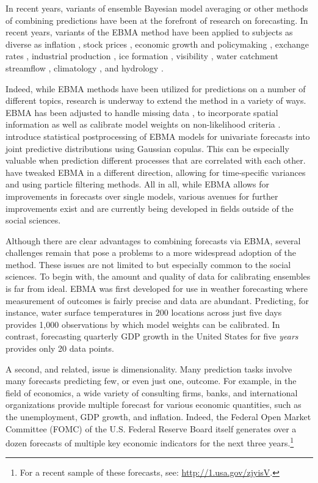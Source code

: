 \documentclass[12pt,fullpage,endnotes]{article}
\begin{document}
In recent years, variants of ensemble Bayesian model averaging or other methods of combining predictions have been at the forefront of research on forecasting. In recent years, variants of the EBMA method have been applied to subjects as diverse as inflation \citep{Wright:2009, Koop:2010, Gneiting:2010},
stock prices \citep{Billio:2011}, economic growth and policymaking
\citep{Brock:2007, Billio:2010}, exchange rates \citep{Wright:2008},
industrial production \citep{Feldkircher:2010}, ice formation
\citep{Berrocal:2010}, visibility \citep{Chmielecki:2010}, water
catchment streamflow \citep{Viney:2009}, climatology \citep{Min:2006,
  Min:2007, Smith:2009}, and hydrology \citep{Zhang:2009}. 

  Indeed, while EBMA methods have been utilized for predictions on a number of different topics, research is underway to extend the method in a variety of ways. EBMA has been adjusted to handle missing data
\citep{Fraley:2010, Mccandless:2011}, to incorporate spatial information \citep{Feldman:2012} as well as calibrate model
weights on non-likelihood criteria \citep[e.g.,][]{Vrugt:2006}.
\citet{MoellerEtAl:2012} introduce statistical postprocessing of EBMA models for univariate forecasts into joint predictive distributions using Gaussian copulas. This can be especially valuable when prediction different processes that are correlated with each other. \citet{RingsEtAl:2012} have tweaked EBMA in a different direction, allowing for time-specific variances and using particle filtering methods. All in all, while EBMA allows for improvements in forecasts over single models, various avenues for further improvements exist and are currently being developed in fields outside of the social sciences.  

Although there are clear advantages to combining forecasts via EBMA,
several challenges remain that pose a problems to a more widespread adoption of the method. These issues are not limited to but especially common to the social sciences. To begin with,
the amount and quality of data for calibrating ensembles is far from
ideal. EBMA was first developed for use in weather forecasting where
measurement of outcomes is fairly precise and data are abundant. Predicting, for instance, water surface temperatures in 200 locations
across just five days provides 1,000 observations by which model
weights can be calibrated. In contrast, forecasting quarterly GDP
growth in the United States for five \textit{years} provides only 20 data points.

A second, and related, issue is dimensionality. Many prediction tasks
involve many forecasts predicting few, or even just one, outcome.  For
example, in the field of economics, a wide variety of consulting
firms, banks, and international organizations provide multiple
forecast for various economic quantities, such as the unemployment, GDP
growth, and inflation.  Indeed, the Federal Open Market Committee
(FOMC) of the U.S. Federal Reserve Board itself generates over a dozen
forecasts of multiple key economic indicators for the next three
years.\footnote{For a recent sample of these forecasts, see:
  \url{http://1.usa.gov/zjyisV}.}
\end{document}
